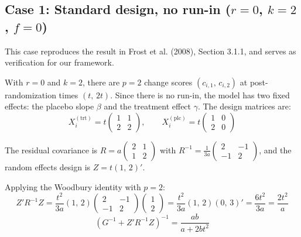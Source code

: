 \documentclass[
]{article}
\begin{document}
\subsection{\texorpdfstring{Case 1: Standard design, no run-in (\(r=0\),
\(k=2\),
\(f=0\))}{Case 1: Standard design, no run-in (r=0, k=2, f=0)}}\label{case-1-standard-design-no-run-in-r0-k2-f0}

This case reproduces the result in Frost et al. (2008), Section 3.1.1,
and serves as verification for our framework.

With \(r=0\) and \(k=2\), there are \(p = 2\) change scores
\((c_{i,1},\, c_{i,2})\) at post-randomization times \((t,\,
2t)\). Since there is no run-in, the model has two fixed effects: the
placebo slope \(\beta\) and the treatment effect \(\gamma\). The design
matrices are: \[
  X_i^{(\text{trt})} = t\begin{pmatrix}
    1 & 1 \\ 2 & 2
  \end{pmatrix}, \qquad
  X_i^{(\text{plc})} = t\begin{pmatrix}
    1 & 0 \\ 2 & 0
  \end{pmatrix}
\]

The residual covariance is
\(R = a \begin{pmatrix} 2 & 1 \\ 1 & 2 \end{pmatrix}\) with
\(R^{-1} = \frac{1}{3a}
\begin{pmatrix} 2 & -1 \\ -1 & 2 \end{pmatrix}\), and the random effects
design is \(Z = t(1,\, 2)'\).

Applying the Woodbury identity with \(p = 2\): \begin{equation}
  Z'R^{-1}Z = \frac{t^2}{3a}(1,\,2)
    \begin{pmatrix}2&-1\\-1&2\end{pmatrix}
    \begin{pmatrix}1\\2\end{pmatrix}
  = \frac{t^2}{3a}(1,\,2)(0,\,3)' = \frac{6t^2}{3a}
  = \frac{2t^2}{a}
\end{equation} \begin{equation}
  (G^{-1} + Z'R^{-1}Z)^{-1}
  = \frac{ab}{a + 2bt^2}
\end{equation}
\end{document}

